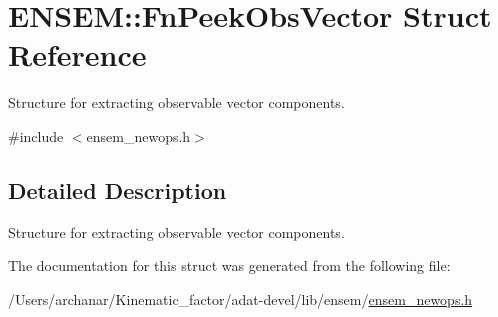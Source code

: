 \hypertarget{structENSEM_1_1FnPeekObsVector}{}\section{E\+N\+S\+EM\+:\+:Fn\+Peek\+Obs\+Vector Struct Reference}
\label{structENSEM_1_1FnPeekObsVector}


Structure for extracting observable vector components.  




{\ttfamily \#include $<$ensem\+\_\+newops.\+h$>$}



\subsection{Detailed Description}
Structure for extracting observable vector components. 

The documentation for this struct was generated from the following file\+:\begin{DoxyCompactItemize}
\item 
/\+Users/archanar/\+Kinematic\+\_\+factor/adat-\/devel/lib/ensem/\mbox{\hyperlink{adat-devel_2lib_2ensem_2ensem__newops_8h}{ensem\+\_\+newops.\+h}}\end{DoxyCompactItemize}
